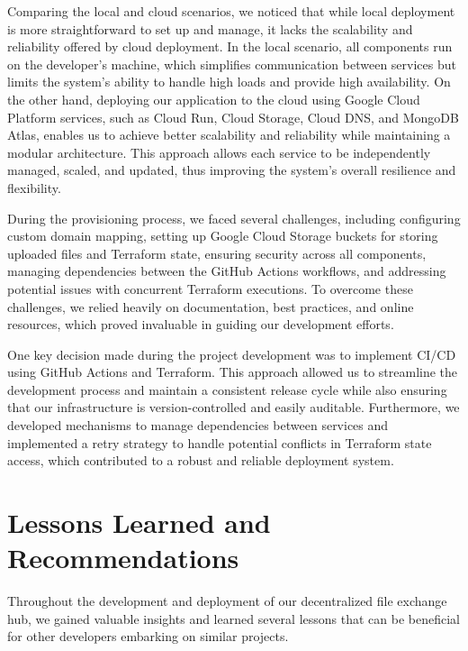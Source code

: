 \documentclass[a4paper,fleqn]{cas-sc}
\begin{document}
Comparing the local and cloud scenarios, we noticed that while local deployment is more straightforward to set up and manage, it lacks the scalability and reliability offered by cloud deployment. In the local scenario, all components run on the developer's machine, which simplifies communication between services but limits the system's ability to handle high loads and provide high availability. On the other hand, deploying our application to the cloud using Google Cloud Platform services, such as Cloud Run, Cloud Storage, Cloud DNS, and MongoDB Atlas, enables us to achieve better scalability and reliability while maintaining a modular architecture. This approach allows each service to be independently managed, scaled, and updated, thus improving the system's overall resilience and flexibility.

During the provisioning process, we faced several challenges, including configuring custom domain mapping, setting up Google Cloud Storage buckets for storing uploaded files and Terraform state, ensuring security across all components, managing dependencies between the GitHub Actions workflows, and addressing potential issues with concurrent Terraform executions. To overcome these challenges, we relied heavily on documentation, best practices, and online resources, which proved invaluable in guiding our development efforts.

One key decision made during the project development was to implement CI/CD using GitHub Actions and Terraform. This approach allowed us to streamline the development process and maintain a consistent release cycle while also ensuring that our infrastructure is version-controlled and easily auditable. Furthermore, we developed mechanisms to manage dependencies between services and implemented a retry strategy to handle potential conflicts in Terraform state access, which contributed to a robust and reliable deployment system.

\section{Lessons Learned and Recommendations}

Throughout the development and deployment of our decentralized file exchange hub, we gained valuable insights and learned several lessons that can be beneficial for other developers embarking on similar projects.
\end{document}
